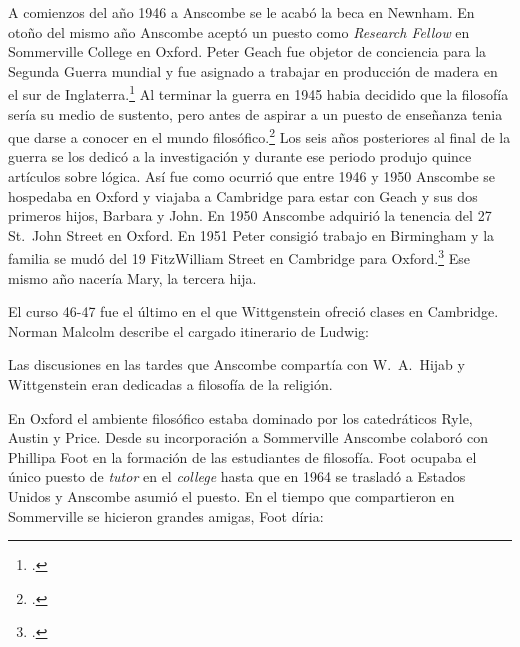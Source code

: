 A comienzos del año 1946 a Anscombe se le acabó la beca en Newnham. En otoño
del mismo año Anscombe aceptó un puesto como \emph{Research Fellow} en
Sommerville College en Oxford. Peter Geach fue objetor de conciencia para la
Segunda Guerra mundial y fue asignado a trabajar en producción de madera en el
sur de Inglaterra.\footcite[cf.~][p.~34]{biofellows} Al terminar la guerra en
1945 habia decidido que la filosofía sería su medio de sustento, pero antes de
aspirar a un puesto de enseñanza tenia que darse a conocer en el mundo
filosófico.\footcite[cf.~][p.~12]{phiaut} Los seis años posteriores al final
de la guerra se los dedicó a la investigación y durante ese periodo produjo
quince artículos sobre lógica. Así fue como ocurrió que entre 1946 y 1950
Anscombe se hospedaba en Oxford y viajaba a Cambridge para estar con Geach y
sus dos primeros hijos, Barbara y John. En 1950 Anscombe adquirió la tenencia
del 27 St.~John Street en Oxford. En 1951 Peter consigió trabajo en Birmingham
y la familia se mudó del 19 FitzWilliam Street en Cambridge para
Oxford.\footcite[cf.~][p.~208]{NWR} Ese mismo año nacería Mary, la tercera
hija.

El curso 46-47 fue el último en el que Wittgenstein ofreció clases en Cambridge.
Norman Malcolm describe el cargado itinerario de Ludwig:

Las discusiones en las tardes que Anscombe compartía con W.~A.~Hijab y
Wittgenstein eran dedicadas a filosofía de la religión.

En Oxford el ambiente filosófico estaba dominado por los catedráticos Ryle,
Austin y Price. Desde su incorporación a Sommerville Anscombe colaboró con
Phillipa Foot en la formación de las estudiantes de filosofía. Foot ocupaba
el único puesto de \emph{tutor} en el \emph{college} hasta que en 1964 se
trasladó a Estados Unidos y Anscombe asumió el puesto. En el tiempo que
compartieron en Sommerville se hicieron grandes amigas, Foot díria:


